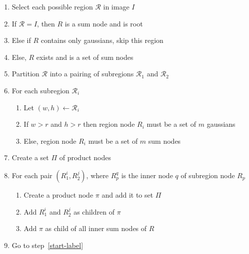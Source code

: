\documentclass{amsart}
\newcommand{\region}{\mathcal}
\theoremstyle{plain}
\numberwithin{equation}{section}
\begin{document}
\begin{enumerate}[label=\arabic*.]
  \item\label{start-label} Select each possible region $\region{R}$ in image $I$
  \item If $\region{R} = I$, then $R$ is a sum node and is root
  \item Else if $R$ contains only gaussians, skip this region
  \item Else, $R$ exists and is a set of sum nodes
  \item Partition $\region{R}$ into a pairing of subregions $\region{R}_1$ and $\region{R}_2$
  \item For each subregion $\region{R}_i$
    \begin{enumerate}[label*=\arabic*]
      \item Let $(w, h) \gets \region{R}_i$
      \item If $w > r$ and $h > r$ then region node $R_i$ must be a set of $m$ gaussians
      \item Else, region node $R_i$ must be a set of $m$ sum nodes
    \end{enumerate}
  \item Create a set $\Pi$ of product nodes
  \item For each pair $(R_1^i, R_2^j)$, where $R_p^q$ is the inner node $q$ of subregion node $R_p$
    \begin{enumerate}[label*=\arabic*]
      \item Create a product node $\pi$ and add it to set $\Pi$
      \item Add $R_1^i$ and $R_2^j$ as children of $\pi$
      \item Add $\pi$ as child of all inner sum nodes of $R$
    \end{enumerate}
  \item Go to step~\ref{start-label}
\end{enumerate}
\end{document}
